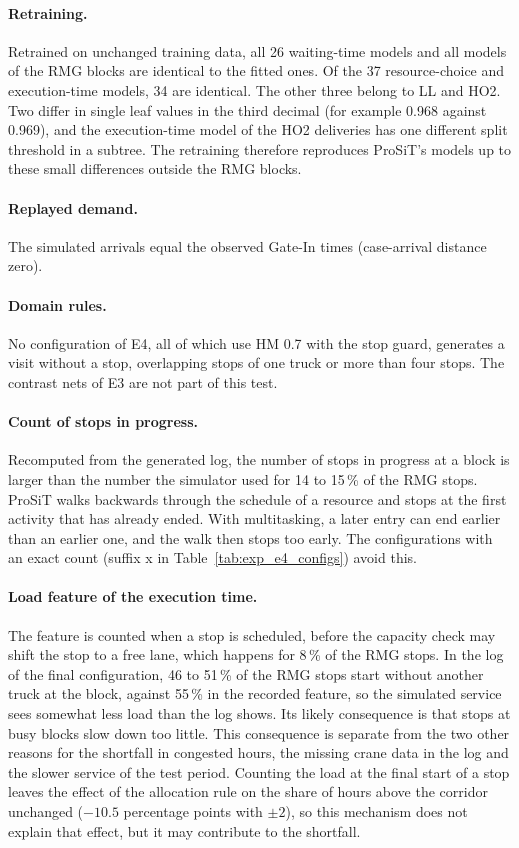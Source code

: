 \paragraph{Retraining.} Retrained on unchanged training data, all 26 waiting-time
models and all models of the RMG blocks are identical to the fitted ones. Of the 37
resource-choice and execution-time models, 34 are identical. The other three belong to
LL and HO2. Two differ in single leaf values in the third decimal (for example 0.968
against 0.969), and the execution-time model of the HO2 deliveries has one different
split threshold in a subtree. The retraining therefore reproduces ProSiT's models up
to these small differences outside the RMG blocks.

\paragraph{Replayed demand.} The simulated arrivals equal the observed Gate-In times
(case-arrival distance zero).

\paragraph{Domain rules.} No configuration of E4, all of which use HM 0.7 with the
stop guard, generates a visit without a stop, overlapping stops of one truck or more
than four stops. The contrast nets of E3 are not part of this test.

\paragraph{Count of stops in progress.} Recomputed from the generated log, the number
of stops in progress at a block is larger than the number the simulator used for 14
to 15\,\% of the RMG stops. ProSiT walks backwards through the schedule of a resource
and stops at the first activity that has already ended. With multitasking, a later
entry can end earlier than an earlier one, and the walk then stops too early. The
configurations with an exact count (suffix x in Table~\ref{tab:exp_e4_configs}) avoid
this.

\paragraph{Load feature of the execution time.} The feature is counted when a stop is
scheduled, before the capacity check may shift the stop to a free lane, which happens
for 8\,\% of the RMG stops. In the log of the final configuration, 46 to 51\,\% of the
RMG stops start without another truck at the block, against 55\,\% in the recorded
feature, so the simulated service sees somewhat less load than the log shows. Its
likely consequence is that stops at busy blocks slow down too little. This
consequence is separate from the two other reasons for the shortfall in congested
hours, the missing crane data in the log and the slower service of the test period.
Counting the load at the final start of a stop leaves the effect of the allocation
rule on the share of hours above the corridor unchanged ($-10.5$ percentage points
with $\pm 2$), so this mechanism does not explain that effect, but it may contribute
to the shortfall.

